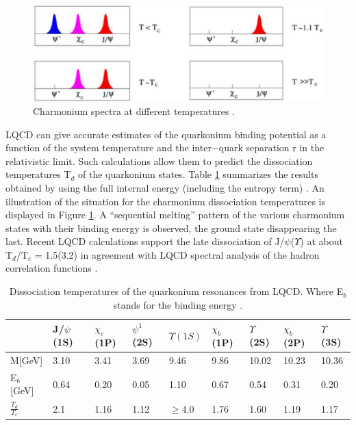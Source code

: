 \begin{figure}
  \includegraphics[width=\hugefigwidth]{chap_QuarkoniaSurvey_figures/Quarkonia_SATZ2}
  \caption[QuarkoniaAtTc]{Charmonium spectra at different temperatures \cite{SATZ2}.}
   \label{fig:QuarkoniaAtTc}
\end{figure}



LQCD can give accurate estimates of the quarkonium binding potential
as a function of the system temperature and the inter$-$quark separation
r in the relativistic limit. Such calculations allow them to predict the dissociation
temperatures T$_d$ of the quarkonium states. Table \ref{tab:quarkoniaproperties} summarizes
the results obtained by using the full internal energy (including the entropy
term) \cite{SATZ,Frithjof}. An illustration of the situation for the charmonium dissociation
temperatures is displayed in Figure \ref{fig:QuarkoniaAtTc}. A ``sequential melting'' pattern of the
various charmonium states with their binding energy is observed, the ground
state disappearing the last. Recent LQCD calculations support the late dissociation
of J/$\psi$($\Upsilon$) at about T$_d$/T$_c$ = 1.5(3.2) \cite{Matthias} in agreement with LQCD
spectral analysis of the hadron correlation functions \cite{Jakovac}.

\begin{table}[bht]
\caption[QuarkoniaProperties]{Dissociation temperatures of the quarkonium resonances from
LQCD. Where E$_b$ stands for the binding energy \cite{SATZ, Rev_PartPhysics, Frithjof}.}
\label{tab:quarkoniaproperties}
\begin{tabular}{lllllllll}
\hline
               &J/$\psi$(1S)  &$\chi_c$(1P)  &$\psi^{1}$(2S)  &$\Upsilon(1S)$  &$\chi_b$(1P)  &$\Upsilon$(2S)  &$\chi_b$(2P)  &$\Upsilon$(3S) \\
\hline
M[GeV]             &3.10          &3.41          &3.69           &9.46            &9.86           &10.02          &10.23         &10.36  \\              
E$_b$[GeV]         &0.64          &0.20          &0.05           &1.10            &0.67           &0.54           &0.31          &0.20   \\
$\frac{T_d}{T_c}$  &2.1           &1.16          &1.12            &$\geq$4.0      &1.76           &1.60           &1.19          &1.17   \\
\hline
\end{tabular}
\end{table}


